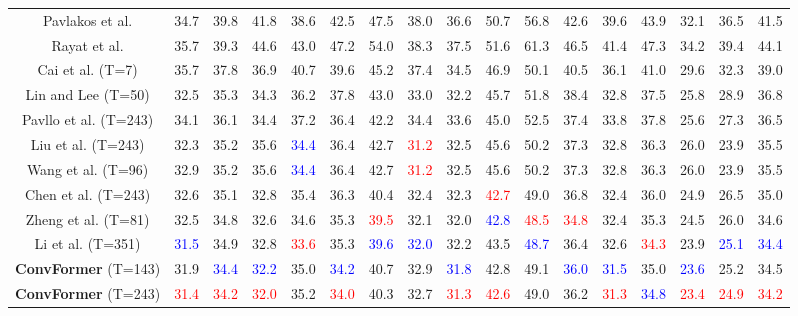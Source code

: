 \documentclass{article}
\begin{document}
\begin{table*}[!htb]
{\begin{tabular}{*{17}{|c}|}
 \hline
  Pavlakos et al. \cite{PZDD17} & 34.7 & 39.8 & 41.8 & 38.6 & 42.5 & 47.5 & 38.0 & 36.6 & 50.7 &  56.8 & 42.6 &39.6 & 43.9 & 32.1 & 36.5 & 41.5 \\
   Rayat et al. \cite{RL18} & 35.7 & 39.3 & 44.6 &43.0 & 47.2 & 54.0 & 38.3 & 37.5 & 51.6 & 61.3 & 46.5 & 41.4 &  47.3 & 34.2 & 39.4 & 44.1 \\
    Cai et al. \cite{CGLCCYT19} (T=7) & 35.7 & 37.8 & 36.9 & 40.7 & 39.6 & 45.2 & 37.4 & 34.5 & 46.9 & 50.1 & 40.5 & 36.1 & 41.0 & 29.6 &  32.3 & 39.0 \\
   Lin and Lee \cite{LL19} (T=50) & 32.5 & 35.3 & 34.3 &  36.2 & 37.8 & 43.0 & 33.0 & 32.2& 45.7 &  51.8 & 38.4 & 32.8 & 37.5 & 25.8 & 28.9 & 36.8 \\
  Pavllo et al. \cite{PFGA19} (T=243) & 34.1 & 36.1 & 34.4 & 37.2 & 36.4 & 42.2 & 34.4 & 33.6 & 45.0 & 52.5 & 37.4 & 33.8  & 37.8 & 25.6 & 27.3 & 36.5 \\
 Liu et al. \cite{LSWCCA20} (T=243) & 32.3 & 35.2 & 35.6 & \textcolor{blue}{34.4} & 36.4 & 42.7 & \textcolor{red}{31.2} & 32.5 & 45.6 & 50.2 & 37.3 & 32.8 & 36.3 & 26.0& 23.9 & 35.5\\
  Wang et al. \cite{WYXL20} (T=96) & 32.9 & 35.2 & 35.6 & \textcolor{blue}{34.4} & 36.4 & 42.7 & \textcolor{red}{31.2} & 32.5 & 45.6 & 50.2 & 37.3 & 32.8 & 36.3 & 26.0 & 23.9 & 35.5 \\
   Chen et al. \cite{CFSZCL21} (T=243) &  32.6 & 35.1 & 32.8  & 35.4 & 36.3 & 40.4 & 32.4 & 32.3 & \textcolor{red}{42.7} & 49.0 & 36.8 & 32.4 & 36.0 & 24.9 & 26.5 &  35.0 \\
   Zheng et al. \cite{ZZMYCD21} (T=81) & 32.5 & 34.8 & 32.6 & 34.6 & 35.3 & \textcolor{red}{39.5} & 32.1 & 32.0 & \textcolor{blue}{42.8} & \textcolor{red}{48.5} & \textcolor{red}{34.8} & 32.4 & 35.3 & 24.5 & 26.0 & 34.6 \\
   Li et al. \cite{li2022mhformer} (T=351) & \textcolor{blue}{31.5} & 34.9 & 32.8 & \textcolor{red}{33.6} & 35.3 & \textcolor{blue}{39.6} & \textcolor{blue}{32.0} & 32.2 & 43.5 & \textcolor{blue}{48.7} & 36.4 & 32.6 & \textcolor{red}{34.3} & 23.9 & \textcolor{blue}{25.1} & \textcolor{blue}{34.4} \\
 \hline
 \textbf{ConvFormer} (T=143) & 31.9 & \textcolor{blue}{34.4} & \textcolor{blue}{32.2} & 35.0 & \textcolor{blue}{34.2} & 40.7 & 32.9 & \textcolor{blue}{31.8} & 42.8 & 49.1 & \textcolor{blue}{36.0} & \textcolor{blue}{31.5} & 35.0 & \textcolor{blue}{23.6} & 25.2 & 34.5 \\
  \textbf{ConvFormer} (T=243) & \textcolor{red}{31.4} & \textcolor{red}{34.2} & \textcolor{red}{32.0} & 35.2 & \textcolor{red}{34.0} & 40.3 & 32.7 & \textcolor{red}{31.3} & \textcolor{red}{42.6} & 49.0 & 36.2 & \textcolor{red}{31.3} & \textcolor{blue}{34.8} & \textcolor{red}{23.4} & \textcolor{red}{24.9} & \textcolor{red}{34.2} \\
  \hline



\end{tabular}}
\end{table*}
\end{document}
